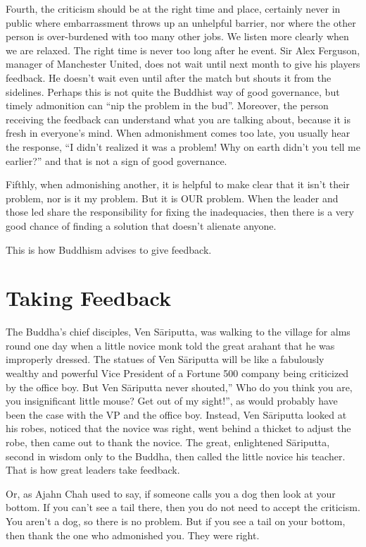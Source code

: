 \documentclass[11pt, openany]{book}
\begin{document}
Fourth, the criticism should be at the right time and place, certainly never in public where embarrassment throws up an unhelpful barrier, nor where the other person is over-burdened with too many other jobs. We listen more clearly when we are relaxed. The right time is never too long after he event. Sir Alex Ferguson, manager of Manchester United, does not wait until next month to give his players feedback. He doesn’t wait even until after the match but shouts it from the sidelines. Perhaps this is not quite the Buddhist way of good governance, but timely admonition can “nip the problem in the bud”. Moreover, the person receiving the feedback can understand what you are talking about, because it is fresh in everyone’s mind. When admonishment comes too late, you usually hear the response, “I didn’t realized it was a problem! Why on earth didn’t you tell me earlier?” and that is not a sign of good governance.

Fifthly, when admonishing another, it is helpful to make clear that it isn’t their problem, nor is it my problem. But it is OUR problem. When the leader and those led share the responsibility for fixing the inadequacies, then there is a very good chance of finding a solution that doesn’t alienate anyone.

This is how Buddhism advises to give feedback.

\section{Taking Feedback}

The Buddha’s chief disciples, Ven Sāri\-putta, was walking to the village for alms round one day when a little novice monk told the great arahant that he was improperly dressed. The statues of Ven Sāri\-putta will be like a fabulously wealthy and powerful Vice President of a Fortune 500 company being criticized by the office boy. But Ven Sāri\-putta never shouted,” Who do you think you are, you insignificant little mouse? Get out of my sight!”, as would probably have been the case with the VP and the office boy. Instead, Ven Sāri\-putta looked at his robes, noticed that the novice was right, went behind a thicket to adjust the robe, then came out to thank the novice. The great, enlightened Sāri\-putta, second in wisdom only to the Buddha, then called the little novice his teacher. That is how great leaders take feedback.

Or, as Ajahn Chah used to say, if someone calls you a dog then look at your bottom. If you can’t see a tail there, then you do not need to accept the criticism. You aren’t a dog, so there is no problem. But if you see a tail on your bottom, then thank the one who admonished you. They were right.
\end{document}
